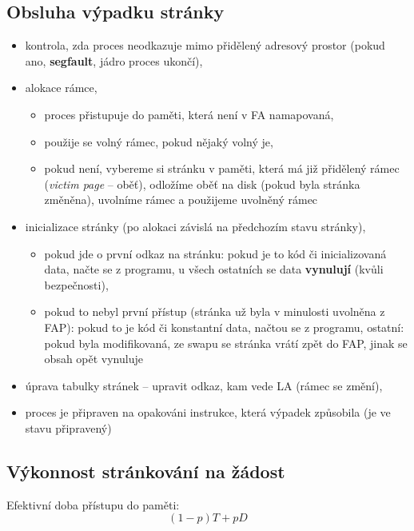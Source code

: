 \documentclass[a4paper, 11pt]{article}
\begin{document}
\subsection{Obsluha výpadku stránky}
\begin{itemize}
    \item kontrola, zda proces neodkazuje mimo přidělený adresový prostor (pokud ano, \textbf{segfault}, jádro proces ukončí),
    \item alokace rámce,
    
    \begin{itemize}
        \item proces přistupuje do paměti, která není v FA namapovaná,
        \item použije se volný rámec, pokud nějaký volný je,
        \item pokud není, vybereme si stránku v paměti, která má již přidělený rámec (\emph{victim page} -- oběť), odložíme oběť na disk (pokud byla stránka změněna), uvolníme rámec a použijeme uvolněný rámec 
    \end{itemize}
    
    \item inicializace stránky (po alokaci závislá na předchozím stavu stránky),
    \begin{itemize}
        \item pokud jde o první odkaz na stránku: pokud je to kód či inicializovaná data, načte se z programu, u všech ostatních se data \textbf{vynulují} (kvůli bezpečnosti),
        \item pokud to nebyl první přístup (stránka už byla v minulosti uvolněna z FAP): pokud to je kód či konstantní data, načtou se z programu, ostatní: pokud byla modifikovaná, ze swapu se stránka vrátí zpět do FAP, jinak se obsah opět vynuluje
    \end{itemize}
    
    \item úprava tabulky stránek -- upravit odkaz, kam vede LA (rámec se změní),
    \item proces je připraven na opakováni instrukce, která výpadek způsobila (je ve stavu připravený)
\end{itemize}

\subsection{Výkonnost stránkování na žádost}
Efektivní doba přístupu do paměti:
$$(1 - p)T + pD$$
\end{document}
